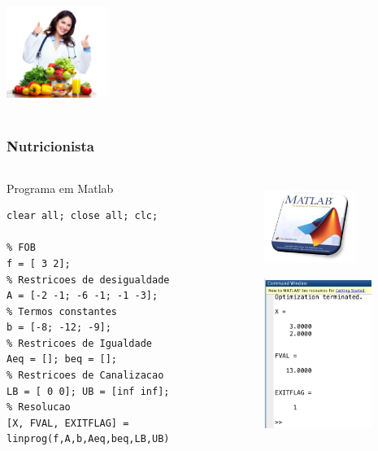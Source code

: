 \documentclass{beamer}
\begin{document}
\begin{frame}
\begin{columns}
\begin{column}{0.4\textwidth}
			\only<11>
			{
				\centering
				\includegraphics[width=3.3cm,height=3.3cm]{nutricionista.jpg}
			}
		\end{column}
	\end{columns}
\end{frame}

\begin{frame}[fragile] 
	\frametitle{Nutricionista}
	\centering
	\begin{columns}
		\begin{column}{0.7\textwidth}
			\begin{block}{Programa em Matlab}
				\begin{lstlisting}
clear all; close all; clc;

% FOB
f = [ 3 2];
% Restricoes de desigualdade
A = [-2 -1; -6 -1; -1 -3];
% Termos constantes 
b = [-8; -12; -9];
% Restricoes de Igualdade
Aeq = []; beq = [];
% Restricoes de Canalizacao
LB = [ 0 0]; UB = [inf inf];
% Resolucao
[X, FVAL, EXITFLAG] = linprog(f,A,b,Aeq,beq,LB,UB)	
				\end{lstlisting}	
			\end{block}
		\end{column}
		\begin{column}{0.3\textwidth}
			\begin{figure}
				{
					\includegraphics[width=3cm,height=3cm]{solver_matlab.png}
				}
				\only<2>
				{
					\includegraphics[width=3.5cm,height=5cm]{Nutri_Matlab.png}
				}
			\end{figure}
		\end{column}				
	\end{columns}
\end{frame}
\end{document}
